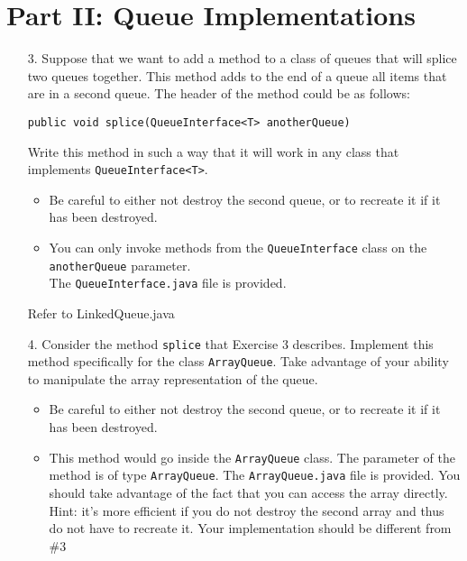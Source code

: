 \documentclass[10pt]{article}
\begin{document}
\section{Part II: Queue Implementations}
	
	\begin{enumerate}
		\item[3.] Suppose that we want to add a method to a class of queues that will splice two queues together. This method adds to the end of a queue all items that are in a second queue. The header of the method could be as follows:
			
			\vspace{0.5cm}
			\texttt{public void splice(QueueInterface<T> anotherQueue)}
			
			\vspace{0.5cm}
			Write this method in such a way that it will work in any class that implements \texttt{QueueInterface<T>}.
				
			\begin{itemize}
				\item Be careful to either not destroy the second queue, or to recreate it if it has been destroyed.
				\item You can only invoke methods from the \texttt{QueueInterface} class on the \texttt{anotherQueue} parameter.\\ The \texttt{QueueInterface.java} file is provided.
			\end{itemize}
			
			\vspace{0.5cm}
			Refer to LinkedQueue.java
			\vspace{0.5cm}
		
		\item[4.] Consider the method \texttt{splice} that Exercise 3 describes. Implement this method specifically for the class \texttt{ArrayQueue}. Take advantage of your ability to manipulate the array representation of the queue.
			
			\begin{itemize}
				\item Be careful to either not destroy the second queue, or to recreate it if it has been destroyed.
				\item This method would go inside the \texttt{ArrayQueue} class. The parameter of the method is of type \texttt{ArrayQueue}. The \texttt{ArrayQueue.java} file is provided. You should take advantage of the fact that you can access the array directly. Hint: it's more efficient if you do not destroy the second array and thus do not have to recreate it. Your implementation should be different from \#3
			\end{itemize}
			

\end{enumerate}
\end{document}
